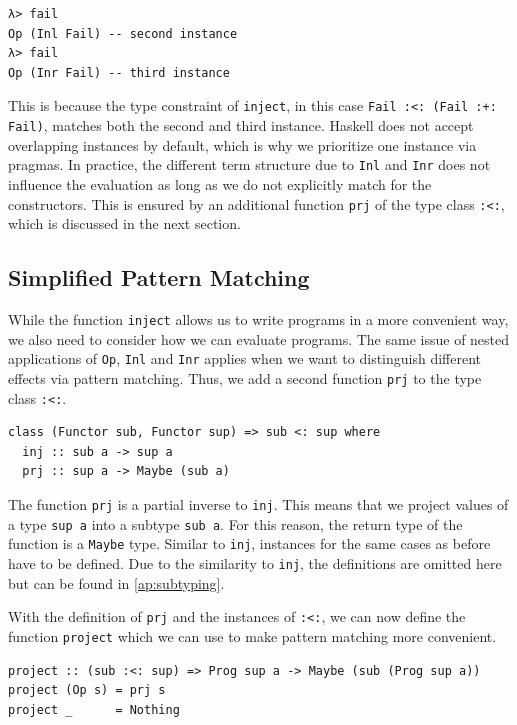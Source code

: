 \documentclass[a4paper, 11pt, fleqn, twoside, abstract=on]{scrreprt}
\newcommand{\hinl}[1]{\texttt{#1}}
\begin{document}
\begin{verbatim}
λ> fail
Op (Inl Fail) -- second instance
λ> fail
Op (Inr Fail) -- third instance
\end{verbatim}
\noindent
This is because the type constraint of \hinl{inject}, in this case \hinl{Fail :<: (Fail :+: Fail)}, matches both the second and third instance.
Haskell does not accept overlapping instances by default, which is why we prioritize one instance via pragmas.
In practice, the different term structure due to \hinl{Inl} and \hinl{Inr} does not influence the evaluation as long as we do not explicitly match for the constructors.
This is ensured by an additional function \hinl{prj} of the type class \hinl{:<:}, which is discussed in the next section.

\subsection{Simplified Pattern Matching}
While the function \hinl{inject} allows us to write programs in a more convenient way, we also need to consider how we can evaluate programs.
The same issue of nested applications of \hinl{Op}, \hinl{Inl} and \hinl{Inr} applies when we want to distinguish different effects via pattern matching.
Thus, we add a second function \hinl{prj} to the type class \hinl{:<:}.

\begin{verbatim}
class (Functor sub, Functor sup) => sub <: sup where
  inj :: sub a -> sup a
  prj :: sup a -> Maybe (sub a)
\end{verbatim}

The function \hinl{prj} is a partial inverse to \hinl{inj}.
This means that we project values of a type \hinl{sup a} into a subtype \hinl{sub a}.
For this reason, the return type of the function is a \hinl{Maybe} type.
Similar to \hinl{inj}, instances for the same cases as before have to be defined.
Due to the similarity to \hinl{inj}, the definitions are omitted here but can be found in \autoref{ap:subtyping}.

With the definition of \hinl{prj} and the instances of \hinl{:<:}, we can now define the function \hinl{project} which we can use to make pattern matching more convenient.

\begin{verbatim}
project :: (sub :<: sup) => Prog sup a -> Maybe (sub (Prog sup a))
project (Op s) = prj s
project _      = Nothing
\end{verbatim}
\end{document}
